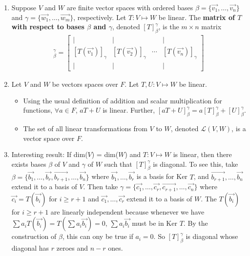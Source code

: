 \documentclass[10pt]{article}
\begin{document}
\begin{multicols*}{2}
\begin{enumerate}
\begin{enumerate}
        \item Suppose $V$ and $W$ are finite vector spaces with ordered bases $\beta = \{ \vec{v_1}, \hdots, \vec{v_n} \}$ and $\gamma = \{ \vec{w_1}, \hdots, \vec{w_m} \}$, respectively. Let $T: V \mapsto W$ be linear. The \textbf{matrix of $T$ with respect to bases $\beta$ and $\gamma$}, denoted $[T]_\beta^\gamma$, is the $m \times n$ matrix
        \begin{align*}
            [T]_\beta^\gamma = \begin{bmatrix}
            \mid & \mid &  & \mid \\
            [T(\vec{v_1})]_\gamma & [T(\vec{v_2})]_\gamma & \cdots & [T(\vec{v_n})]_\gamma \\
            \mid & \mid &  & \mid
            \end{bmatrix}
        \end{align*}
        
        \item Let $V$ and $W$ be vectors spaces over $F$. Let $T,U : V \mapsto W$ be linear. 
        \begin{itemize}
            \item Using the usual definition of addition and scalar multiplication for functions, $\forall a \in F$, $aT + U$ is linear. Further, $[aT+U]_\beta^\gamma = a[T]_\beta^\gamma + [U]_\beta^\gamma$.
            \item The set of all linear transformations from $V$ to $W$, denoted $\mathcal{L}(V,W)$, is a vector space over $F$.
        \end{itemize}
        
        \item Interesting result: If dim($V$) = dim($W$) and $T:V \mapsto W$ is linear, then there exists bases $\beta$ of $V$ and $\gamma$ of $W$ such that $[T]_\beta^\gamma$ is diagonal. To see this, take $\beta = \{\vec{b_1}, \hdots, \vec{b_r}, \vec{b_{r+1}}, \hdots, \vec{b_n} \}$ where $\vec{b_1}, \hdots, \vec{b_r}$ is a basis for Ker $T$, and $\vec{b_{r+1}}, \hdots, \vec{b_n}$ extend it to a basis of $V$. Then take $\gamma = \{\vec{c_1}, \hdots, \vec{c_r}, \vec{c_{r+1}}, \hdots, \vec{c_n} \}$ where $\vec{c_i} = T(\vec{b_i})$ for $i \geq r + 1$ and $\vec{c_1}, \hdots, \vec{c_r}$ extend it to a basis of $W$. The $T(\vec{b_i})$ for $i \geq r + 1$ are linearly independent because whenever we have $\sum a_i T(\vec{b_i}) = T( \sum a_i \vec{b_i} ) = 0$, $\sum a_i \vec{b_i}$ must be in Ker $T$. By the construction of $\beta$, this can ony be true if $a_i = 0$. So $[T]_\beta^\gamma$ is diagonal whose diagonal has $r$ zeroes and $n-r$ ones.
        

\end{enumerate}
\end{enumerate}
\end{multicols*}
\end{document}
